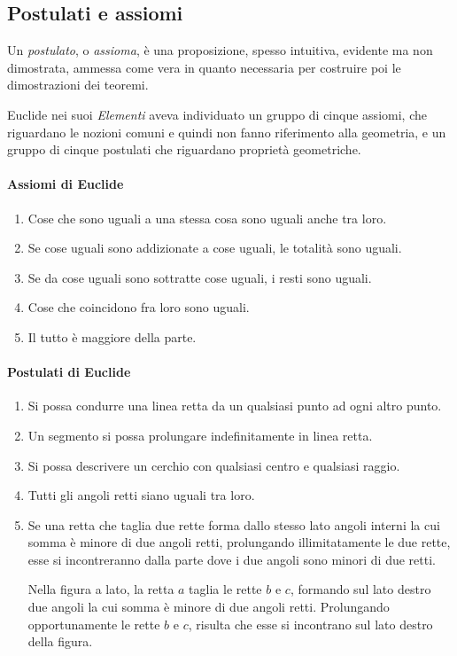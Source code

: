 \vspazio\ovalbox{\risolvi \ref{ese:1.32}}

\subsection{Postulati e assiomi}

Un \emph{postulato}, o \emph{assioma}, è una proposizione, spesso intuitiva, evidente ma non dimostrata, ammessa come vera in quanto necessaria per costruire poi le dimostrazioni dei teoremi.

Euclide nei suoi \emph{Elementi} aveva individuato un gruppo di cinque assiomi, che riguardano le nozioni comuni e quindi non fanno riferimento alla geometria, e un gruppo di cinque postulati che riguardano proprietà geometriche.

\paragraph{Assiomi di Euclide}
\begin{enumerate}[label=\Roman{*}.]
\item Cose che sono uguali a una stessa cosa sono uguali anche tra loro.
\item Se cose uguali sono addizionate a cose uguali, le totalità sono uguali.
\item Se da cose uguali sono sottratte cose uguali, i resti sono uguali.
\item Cose che coincidono fra loro sono uguali.
\item Il tutto è maggiore della parte.
\end{enumerate}

\paragraph{Postulati di Euclide}
\begin{enumerate}[label=\Roman{*}.]
\item Si possa condurre una linea retta da un qualsiasi punto ad ogni altro punto.
\item Un segmento si possa prolungare indefinitamente in linea retta.
\item Si possa descrivere un cerchio con qualsiasi centro e qualsiasi raggio.
\item Tutti gli angoli retti siano uguali tra loro.
\item Se una retta che taglia due rette forma dallo stesso lato angoli interni la cui somma è minore di due angoli retti, prolungando illimitatamente le due rette, esse si incontreranno dalla parte dove i due angoli sono minori di due retti.

\begin{minipage}{.49\textwidth}
\centering
\end{minipage}\hfil
\begin{minipage}{.45\textwidth}
Nella figura a lato, la retta $a$ taglia le rette $b$ e $c$, formando sul lato destro due angoli la cui somma è minore di due angoli retti. Prolungando opportunamente le rette $b$ e $c$, risulta che esse si incontrano sul lato destro della figura.
\end{minipage}
\end{enumerate}

